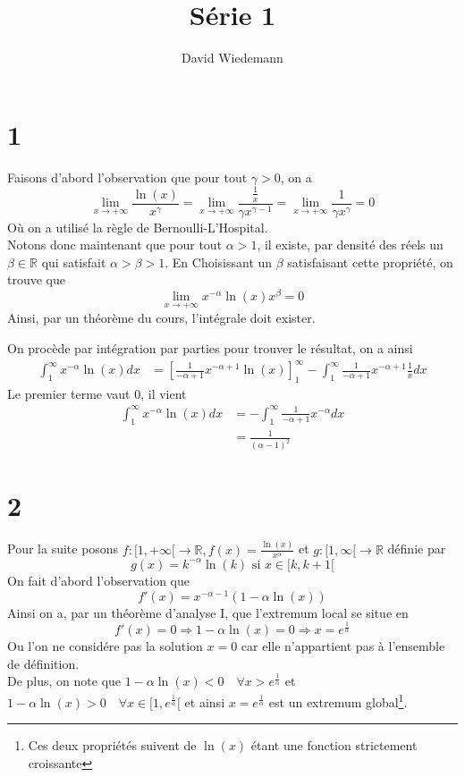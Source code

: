 \documentclass[11pt, a4paper]{article}
\begin{document}
\title{Série 1}
\author{David Wiedemann}
\maketitle
\section*{1}
Faisons d'abord l'observation que pour tout $\gamma>0$, on a
\[ 
	\lim_{x \to  + \infty} \frac{\ln( x) }{x^{\gamma}} = \lim_{x \to  + \infty} \frac{\frac{1}{x}}{\gamma x^{\gamma-1}} = \lim_{x \to  + \infty} \frac{1}{\gamma x^{\gamma}} = 0
\]
Où on a utilisé la règle de Bernoulli-L'Hospital.\\
Notons donc maintenant que pour tout $\alpha>1$, il existe, par densité des réels un $\beta \in \mathbb{R}$ qui satisfait $\alpha>\beta>1$.
En Choisissant un  $\beta$ satisfaisant cette propriété, on trouve que 
 \[ 
	 \lim_{x \to  + \infty} x^{-\alpha} \ln( x) x^{\beta} =0
\]
Ainsi, par un théorème du cours, l'intégrale doit exister.


On procède par intégration par parties pour trouver le résultat, on a ainsi
\begin{align*}
	\int_{ 1 }^{ \infty  } x^{-\alpha}\ln( x) dx &= \left[ \frac{1}{-\alpha+1}x^{-\alpha+1}\ln( x) \right]_{1}^{ \infty } - \int_{ 1 }^{ \infty  } \frac{1}{-\alpha+1}x^{-\alpha+1} \frac{1}{x} dx
\end{align*}
Le premier terme vaut 0, il vient
\begin{align*}
	\int_{ 1 }^{ \infty  } x^{-\alpha}\ln( x) dx &=  - \int_{ 1 }^{ \infty  } \frac{1}{-\alpha+1}x^{-\alpha}  dx\\
						     &=  \frac{1}{( \alpha-1) ^{2}} 
\end{align*}
\section*{2}
Pour la suite posons $f: [ 1, + \infty[ \to \mathbb{R},f(x) = \frac{\ln( x) }{x^{\alpha}}$ et $g:[1, \infty[ \to \mathbb{R}$ définie par
\[ 
	g( x) = k^{-\alpha}\ln( k)  \text{ si } x \in [ k,k+1[ 
\]
On fait d'abord l'observation que 
\[ 
	f'( x) = x^{-\alpha-1}\left( 1- \alpha \ln( x) \right) 
\]
Ainsi on a, par un théorème d'analyse I, que l'extremum local se situe en 
\[ 
	f'( x) =0 \Rightarrow 	1 - \alpha \ln( x) = 0 \Rightarrow x = e^{\frac{1}{\alpha}} 
\]
Ou l'on ne considére pas la solution $x=0$ car elle n'appartient pas à l'ensemble de définition.\\
De plus, on note que $1-\alpha \ln( x) <0 \quad \forall x> e^{\frac{1}{\alpha}}$ et $1-\alpha \ln( x) >0 \quad \forall x \in [ 1, e^{\frac{1}{\alpha}}[ $ et ainsi $x= e^{\frac{1}{\alpha}}$ est un extremum global\footnote{Ces deux propriétés suivent de $\ln( x) $ étant une fonction strictement croissante}.\\
\end{document}
